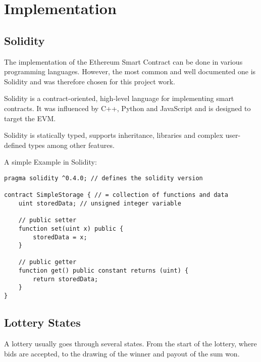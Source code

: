 \chapter{Implementation}\label{chap:impl}
\chapterstart


\section{Solidity}\label{sec:solidity}

The implementation of the Ethereum Smart Contract can be done in various programming languages. However, the most common and well documented one is Solidity and was therefore chosen for this project work.

Solidity is a contract-oriented, high-level language for implementing smart contracts. It was influenced by C++, Python and JavaScript and is designed to target the \ac{EVM}.

Solidity is statically typed, supports inheritance, libraries and complex user-defined types among other features.


A simple Example in Solidity:
\begin{lstlisting}[language=Solidity]
pragma solidity ^0.4.0; // defines the solidity version

contract SimpleStorage { // = collection of functions and data
    uint storedData; // unsigned integer variable

    // public setter
    function set(uint x) public {
        storedData = x;
    }

    // public getter
    function get() public constant returns (uint) {
        return storedData;
    }
}
\end{lstlisting}


\section{Lottery States}\label{sec:states}

A lottery usually goes through several states. From the start of the lottery, where bids are accepted, to the drawing of the winner and payout of the sum won.

